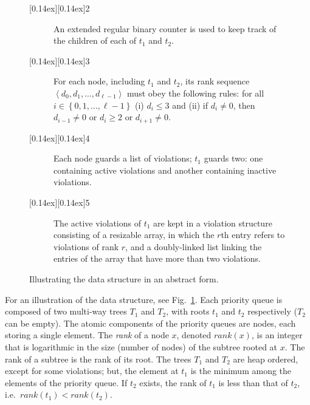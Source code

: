 \documentclass{llncs}
\newcommand{\sequence}[1]{\left\langle#1\right\rangle}
\newcommand{\set}[1]{\left\{#1\right\}}
\newcommand{\rank}{\mbox{$\mathit{rank}$}}
\newcommand{\circled}[1]{\raisebox{0.14ex}[0.14ex][0.14ex]{\textbigcircle}\hspace*{-0.82em}#1}
\begin{document}
\begin{figure}[!tb]
\begin{description}
\item[{\normalfont\circled{2}}~\,] An
  extended regular binary counter is used to keep track of the children
  of each of $t_1$ and $t_2$.

\item[{\normalfont\circled{3}}~\,] For each node, including $t_1$ and
  $t_2$, its rank sequence $\sequence{d_0,d_1,\ldots,d_{\ell -1}}$
  must obey the following rules: for all $i\in\set{0,1,\ldots,\ell-1}$
  (i) $d_i \leq 3$ and (ii) if $d_i \neq 0$, then $d_{i-1} \neq 0$ or
  $d_i \geq 2$ or $d_{i+1} \neq 0$.

\item[{\normalfont\circled{4}}~\,] Each node guards a list of violations;
  $t_1$ guards two: one containing active violations and another
  containing inactive violations.

\item[{\normalfont\circled{5}}~\,] The active violations of $t_1$ are kept 
   in a violation structure consisting of a resizable array, in which the $r$th entry 
   refers to violations of rank $r$, and a doubly-linked 
   list linking the entries of the array that have more than two violations.
\end{description}
\vspace{-.2in}
\caption{Illustrating the data structure in an abstract form.\label{fig:abstract}}
\vspace{-.2in}
\end{figure}

For an illustration of the data structure, see Fig.~\ref{fig:abstract}.
Each priority queue is composed of two multi-way trees $T_1$ and
$T_2$, with roots $t_1$ and $t_2$ respectively ($T_2$ can be empty).   
The atomic components of the priority queues are nodes, each storing a single element.  
The \emph{rank} of a node $x$, denoted $\rank{}(x)$, is an integer 
that is logarithmic in the size (number of nodes) of the subtree rooted at $x$. 
The rank of a subtree is the rank of its root.
The trees $T_1$ and $T_2$ are heap ordered, except for some violations; 
but, the element at $t_1$ is the minimum among the elements of the
priority queue. If $t_2$ exists, the rank of $t_1$ is less than that of $t_2$, 
i.e.~$\rank{}(t_1) < \rank{}(t_2)$.  
\end{document}
